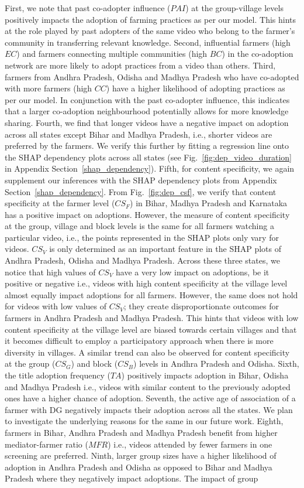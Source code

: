 \documentclass[manuscript,screen]{acmart}
\begin{document}
First, we note that past co-adopter influence ($PAI$) at the group-village levels positively impacts the adoption of farming practices as per our model. This hints at the role played by past adopters of the same video who belong to the farmer’s community in transferring relevant knowledge.  Second, influential farmers (high $EC$) and farmers connecting multiple communities (high $BC$) in the co-adoption network are more likely to adopt practices from a video than others. Third, farmers from Andhra Pradesh, Odisha and Madhya Pradesh who have co-adopted with more farmers (high $CC$) have a higher likelihood of adopting practices as per our model. In conjunction with the past co-adopter influence, this indicates that a larger co-adoption neighbourhood potentially allows for more knowledge sharing. Fourth, we find that longer videos have a negative impact on adoption across all states except Bihar and Madhya Pradesh, i.e., shorter videos are preferred by the farmers. We verify this further by fitting a regression line onto the SHAP dependency plots across all states (see Fig.~\ref{fig:dep_video_duration} in Appendix Section~\ref{shap_dependency}). Fifth, for content specificity, we again supplement our inferences with the SHAP dependency plots from Appendix Section~\ref{shap_dependency}. From Fig.~\ref{fig:dep_csf}, we verify that content specificity at the farmer level ($CS_{F}$) in Bihar, Madhya Pradesh and Karnataka has a positive impact on adoptions. However, the measure of content specificity at the group, village and block levels is the same for all farmers watching a particular video, i.e., the points represented in the SHAP plots only vary for videos. $CS_{V}$ is only determined as an important feature in the SHAP plots of Andhra Pradesh, Odisha and Madhya Pradesh. Across these three states, we notice that high values of $CS_{V}$ have a very low impact on adoptions, be it positive or negative i.e., videos with high content specificity at the village level almost equally impact adoptions for all farmers. However, the same does not hold for videos with low values of $CS_{V}$; they create disproportionate outcomes for farmers in Andhra Pradesh and Madhya Pradesh. This hints that videos with low content specificity at the village level are biased towards certain villages and that it becomes difficult to employ a participatory approach when there is more diversity in villages. A similar trend can also be observed for content specificity at the group ($CS_{G}$) and block ($CS_{B}$) levels in Andhra Pradesh and Odisha. Sixth, the title adoption frequency ($TA$) positively impacts adoption in Bihar, Odisha and Madhya Pradesh i.e., videos with similar content to the previously adopted ones have a higher chance of adoption. Seventh, the active age of association of a farmer with DG negatively impacts their adoption across all the states. We plan to investigate the underlying reasons for the same in our future work. Eighth, farmers in Bihar, Andhra Pradesh and Madhya Pradesh benefit from higher mediator-farmer ratio ($MFR$) i.e., videos attended by fewer farmers in one screening are preferred. Ninth, larger group sizes have a higher likelihood of adoption in Andhra Pradesh and Odisha as opposed to Bihar and Madhya Pradesh where they negatively impact adoptions. The impact of group 
\end{document}
